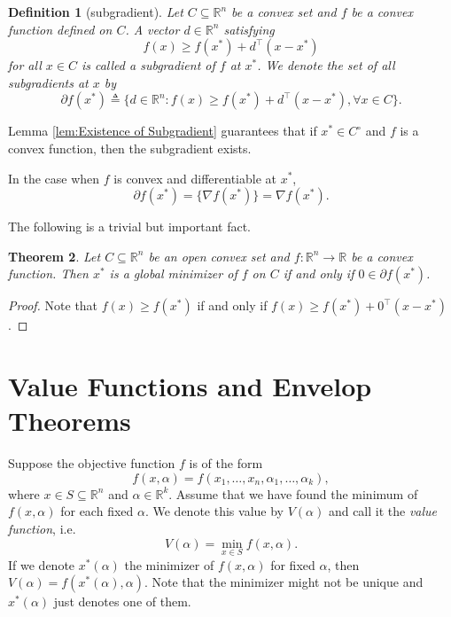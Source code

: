 \documentclass[12pt,a4paper]{report}
\numberwithin{equation}{section}
\theoremstyle{mystyle}
\newtheorem{definition}{Definition}[section]
\newtheorem{theorem}[definition]{Theorem}
\newcommand{\R}{\mathbb{R}}
\newcommand{\grad}{\nabla}
\newcommand{\T}{\top}
\begin{document}
	\begin{definition}[subgradient]
		Let $C\subseteq \R^n$ be a convex set and $f$ be a convex function defined on $C$. A vector $d\in \R^n$ satisfying
		$$
		f(x)\geq f(x^*)+d^\T (x-x^*)
		$$
		for all $x\in C$ is called a \emph{subgradient} of $f$ at $x^*$. We denote the set of all subgradients at $x$ by
		$$
		\partial f(x^*)\triangleq \{d\in \R^n: f(x)\geq f(x^*)+d^\T(x-x^*),\forall x\in C\}.
		$$
	\end{definition}
	Lemma \ref{lem:Existence of Subgradient} guarantees that if $x^*\in C^\circ$ and $f$ is a convex function, then the subgradient exists.
	
	In the case when $f$ is convex and differentiable at $x^*$, $$\partial f(x^*)=\{\grad f(x^*)\}=\grad f(x^*).$$

	The following is a trivial but important fact.
	\begin{theorem}
		Let $C\subseteq \R^n$ be an open convex set and $f:\R^n\to \R$ be a convex function. Then $x^*$ is a global minimizer of $f$ on $C$ if and only if $0\in \partial f(x^*)$.
	\end{theorem}
	\begin{proof}
		Note that $f(x)\geq f(x^*)$ if and only if $f(x)\geq f(x^*)+0^\T (x-x^*)$.
	\end{proof}

	
	
	
	\section{Value Functions and Envelop Theorems}
	Suppose the objective function $f$ is of the form
	$$
	f(x,\alpha)=f(x_1,\dots,x_n,\alpha_1,\dots,\alpha_k),
	$$
	where $x\in S\subseteq \R^n$ and $\alpha\in \R^k$. Assume that we have found the minimum of $f(x,\alpha)$ for each fixed $\alpha$. We denote this value by $V(\alpha)$ and call it the \emph{value function}, i.e.
	$$
	V(\alpha)=\min_{x\in S} f(x,\alpha).
	$$
	If we denote $x^*(\alpha)$ the minimizer of $f(x,\alpha)$ for fixed $\alpha$, then $V(\alpha)=f(x^*(\alpha),\alpha)$. Note that the minimizer might not be unique and $x^*(\alpha)$ just denotes one of them.
	
\end{document}
